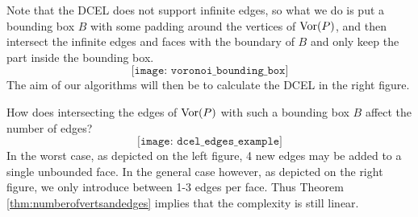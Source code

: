 \begin{rmk} \label{rmk:boxalsohaslinearnumedges}
Note that the DCEL does not support infinite edges, so what we do is put a bounding box $B$ with some padding around the vertices of $\operatorname{Vor}(P)$, and then intersect the infinite edges and faces with the boundary of $B$ and only keep the part inside the bounding box.
\[
    \texttt{[image: voronoi\_bounding\_box]} %
\]
The aim of our algorithms will then be to calculate the DCEL in the right figure.

How does intersecting the edges of $\operatorname{Vor}(P)$ with such a bounding box $B$ affect the number of edges?
\[
    \texttt{[image: dcel\_edges\_example]}
\]
In the worst case, as depicted on the left figure, 4 new edges may be added to a single unbounded face. In the general case however, as depicted on the right figure, we only introduce between 1-3 edges per face. Thus Theorem \ref{thm:numberofvertsandedges} implies that the complexity is still linear.
\end{rmk}